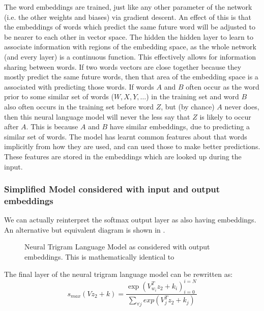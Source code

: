 \documentclass[parskip]{komatufte}
\begin{document}
The word embeddings are trained, just like any other parameter of the network (i.e. the other weights and biases) via gradient descent.
An effect of this is that the embeddings of words which predict the same future word will be adjusted to be nearer to each other in vector space.
The hidden the hidden layer to learn to associate information with regions of the embedding space, as the whole network (and every layer) is a continuous function.
This effectively allows for information sharing between words.
If two words vectors are close together because they mostly predict the same future words, then that area of the embedding space is a associated with predicting those words.
If words $A$ and $B$  often occur as the word prior to some similar set of words ($W,X,Y,\ldots$) in the training set
and word $B$ also often occurs in the training set before word $Z$, but (by chance) $A$ never does,
then this neural language model will never the less say that $Z$ is likely to occur after $A$.
This is because $A$ and $B$ have similar embeddings, due to predicting a similar set of words.
The model has learnt common features about that words implicitly from how they are used, and can used those to make better predictions.
These features are stored in the embeddings which are looked up during the input.

\subsubsection{Simplified Model considered with input and output embeddings}
We can actually reinterpret the softmax output layer as also having embeddings.
An alternative but equivalent diagram is shown in .

\begin{figure}
	\caption{Neural Trigram Language Model as considered with output embeddings. This is mathematically identical to }
	\label{fig:trigram-adv-neural-language-model}
	\centering
	 
\end{figure}

The final layer of the neural trigram language model can be rewritten as:
\begin{equation}
s_{max}(Vz_{2}+k) = \dfrac{\exp\left(V_{w_{i}}^{T}z_{2}+k_{i}\right)_{i=0}^{i=N}}{\sum_{\forall j}exp\left(V_{j}^{T}z_{2}+k_{j}\right)}
\end{equation} 
\end{document}
